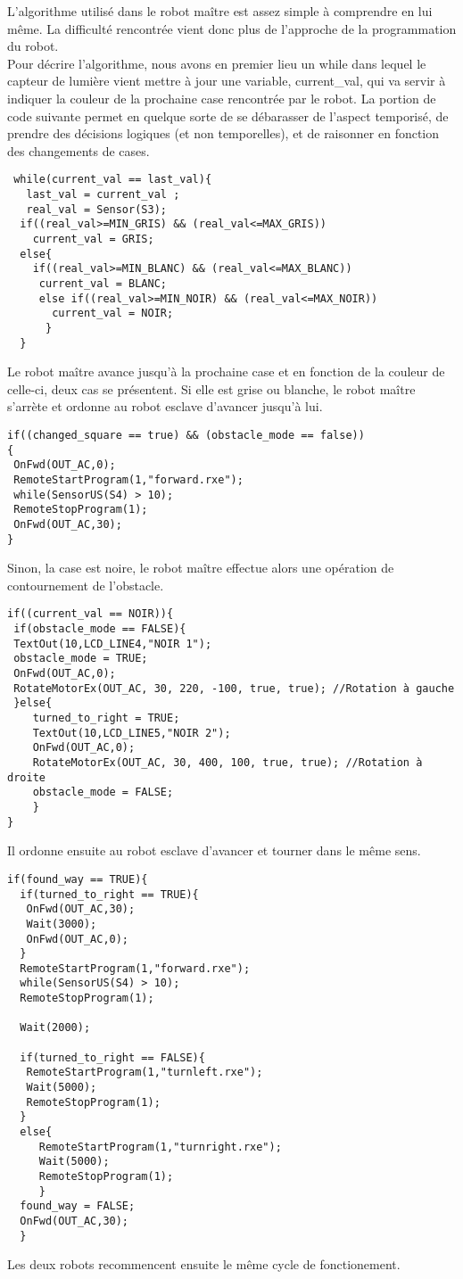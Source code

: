 L'algorithme utilisé dans le robot maître est assez simple à comprendre
en lui même. La difficulté rencontrée vient donc plus de l'approche de la
programmation du robot.
\\
Pour décrire l'algorithme, nous avons en premier lieu un
while dans lequel le capteur de lumière
vient mettre à jour une variable, current\_val, qui va servir à indiquer la couleur de la prochaine
case rencontrée par le robot. La portion de code suivante permet en
quelque sorte de se débarasser de l'aspect temporisé, de prendre des
décisions logiques (et non temporelles), et de raisonner en fonction des
changements de cases.

\begin{verbatim} 
 while(current_val == last_val){
   last_val = current_val ;
   real_val = Sensor(S3);
  if((real_val>=MIN_GRIS) && (real_val<=MAX_GRIS))
    current_val = GRIS;
  else{
    if((real_val>=MIN_BLANC) && (real_val<=MAX_BLANC))
     current_val = BLANC;
     else if((real_val>=MIN_NOIR) && (real_val<=MAX_NOIR))
       current_val = NOIR;
      }
  } 
\end{verbatim}

Le robot maître avance jusqu'à la prochaine case et en fonction de la
couleur de celle-ci, deux cas se présentent.
Si elle est grise ou blanche, le robot maître s'arrète et ordonne au
robot esclave d'avancer jusqu'à lui.

\begin{verbatim}
if((changed_square == true) && (obstacle_mode == false))
{
 OnFwd(OUT_AC,0);
 RemoteStartProgram(1,"forward.rxe");
 while(SensorUS(S4) > 10);
 RemoteStopProgram(1);
 OnFwd(OUT_AC,30);
}
\end{verbatim}

Sinon, la case est noire, le robot maître effectue alors une opération de contournement
de l'obstacle.

\begin{verbatim} 
if((current_val == NOIR)){
 if(obstacle_mode == FALSE){
 TextOut(10,LCD_LINE4,"NOIR 1");
 obstacle_mode = TRUE;
 OnFwd(OUT_AC,0);
 RotateMotorEx(OUT_AC, 30, 220, -100, true, true); //Rotation à gauche
 }else{
    turned_to_right = TRUE;
    TextOut(10,LCD_LINE5,"NOIR 2");
    OnFwd(OUT_AC,0);
    RotateMotorEx(OUT_AC, 30, 400, 100, true, true); //Rotation à droite
    obstacle_mode = FALSE;
    }
}
\end{verbatim}

Il ordonne ensuite au robot esclave d'avancer et tourner dans le même
sens. 

\begin{verbatim}
if(found_way == TRUE){
  if(turned_to_right == TRUE){
   OnFwd(OUT_AC,30);
   Wait(3000);
   OnFwd(OUT_AC,0);
  }
  RemoteStartProgram(1,"forward.rxe");
  while(SensorUS(S4) > 10);
  RemoteStopProgram(1);
 
  Wait(2000);
 
  if(turned_to_right == FALSE){
   RemoteStartProgram(1,"turnleft.rxe");
   Wait(5000);
   RemoteStopProgram(1);
  }
  else{
     RemoteStartProgram(1,"turnright.rxe");
     Wait(5000);
     RemoteStopProgram(1);
     }
  found_way = FALSE;
  OnFwd(OUT_AC,30);
  }
\end{verbatim}

Les deux robots recommencent ensuite le même cycle de fonctionement.